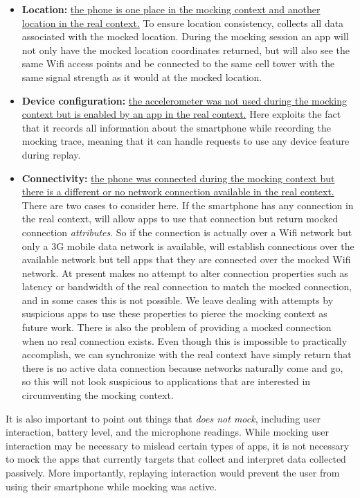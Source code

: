 \begin{itemize}

\item \textbf{Location:} \uline{the phone is one place in the mocking context
and another location in the real context.} To ensure location consistency,
\PocketMocker{} collects all data associated with the mocked location. During
the mocking session an app will not only have the mocked location coordinates
returned, but will also see the same Wifi access points and be connected to
the same cell tower with the same signal strength as it would at the mocked
location.

\item \textbf{Device configuration:} \uline{the accelerometer was not used
during the mocking context but is enabled by an app in the real context.}
Here \PocketMocker{} exploits the fact that it records all information about
the smartphone while recording the mocking trace, meaning that it can handle
requests to use any device feature during replay.

\item \textbf{Connectivity:} \uline{the phone was connected during the
mocking context but there is a different or no network connection available
in the real context.} There are two cases to consider here. If the smartphone
has any connection in the real context, \PocketMocker{} will allow apps to
use that connection but return mocked connection \textit{attributes}. So if
the connection is actually over a Wifi network but only a 3G mobile data
network is available, \PocketMocker{} will establish connections over the
available network but tell apps that they are connected over the mocked Wifi
network. At present \PocketMocker{} makes no attempt to alter connection
properties such as latency or bandwidth of the real connection to match the
mocked connection, and in some cases this is not possible. We leave dealing
with attempts by suspicious apps to use these properties to pierce the mocking
context as future work. There is also the problem of providing a mocked
connection when no real connection exists. Even though this is impossible to
practically accomplish, we can synchronize with the real context have
\PocketMocker{} simply return that there is no active data connection because
networks naturally come and go, so this will not look suspicious to
applications that are interested in circumventing the mocking context.

\end{itemize}

It is also important to point out things that \PocketMocker{} \textit{does
not mock}, including user interaction, battery level, and the microphone
readings. While mocking user interaction may be necessary to mislead certain
types of apps, it is not necessary to mock the apps that \PocketMocker{}
currently targets that collect and interpret data collected passively. More
importantly, replaying interaction would prevent the user from using their
smartphone while mocking was active.


